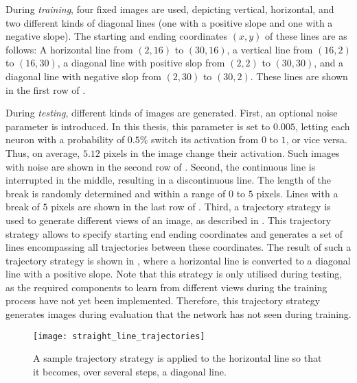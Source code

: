 During \emph{training}, four fixed images are used, depicting vertical, horizontal, and two different kinds of diagonal lines (one with a positive slope and one with a negative slope). The starting and ending coordinates $(x, y)$ of these lines are as follows: A horizontal line from $(2, 16)$ to $(30, 16)$, a vertical line from $(16, 2)$ to $(16, 30)$, a diagonal line with positive slop from $(2, 2)$ to $(30, 30)$, and a diagonal line with negative slop from $(2, 30)$ to $(30, 2)$. These lines are shown in the first row of .

During \emph{testing}, different kinds of images are generated. 
First, an optional noise parameter is introduced. In this thesis, this parameter is set to $0.005$, letting each neuron with a probability of $0.5\%$ switch its activation from $0$ to $1$, or vice versa. Thus, on average, $5.12$ pixels in the image change their activation. Such images with noise are shown in the second row of .
Second, the continuous line is interrupted in the middle, resulting in a discontinuous line. The length of the break is randomly determined and within a range of $0$ to $5$ pixels. Lines with a break of $5$ pixels are shown in the last row of .
Third, a trajectory strategy is used to generate different views of an image, as described in . This trajectory strategy allows to specify starting end ending coordinates and generates a set of lines encompassing all trajectories between these coordinates.
The result of such a trajectory strategy is shown in , where a horizontal line is converted to a diagonal line with a positive slope. Note that this strategy is only utilised during testing, as the required components to learn from different views during the training process have not yet been implemented. Therefore, this trajectory strategy generates images during evaluation that the network has not seen during training. 

\begin{figure}[h]
    \centering
    \texttt{[image: straight\_line\_trajectories]}
    \caption[Sample line trajectory strategy]{A sample trajectory strategy is applied to the horizontal line so that it becomes, over several steps, a diagonal line.}
\end{figure}


